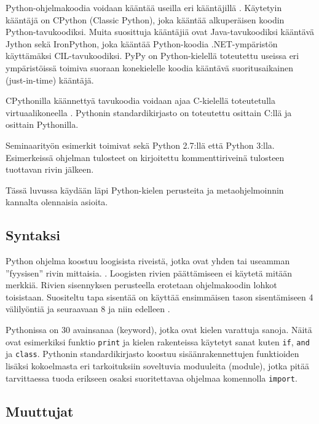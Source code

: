 \documentclass[finnish]{tktltiki2}
\theoremstyle{definition}
\theoremstyle{remark}
\begin{document}
Python-ohjelmakoodia voidaan kääntää useilla eri kääntäjillä \cite{martelli2006python}. Käytetyin kääntäjä on CPython (Classic Python), joka kääntää alkuperäisen koodin Python-tavukoodiksi. Muita suosittuja kääntäjiä ovat Java-tavukoodiksi kääntävä Jython sekä IronPython, joka kääntää Python-koodia .NET-ympäristön käyttämäksi CIL-tavukoodiksi. PyPy on Python-kielellä toteutettu useissa eri ympäristöissä toimiva suoraan konekielelle koodia kääntävä suoritusaikainen (just-in-time) kääntäjä. %

CPythonilla käännettyä tavukoodia voidaan ajaa C-kielellä toteutetulla virtuaalikoneella \cite{martelli2006python}. Pythonin standardikirjasto on toteutettu osittain C:llä ja osittain Pythonilla.

Seminaarityön esimerkit toimivat sekä Python 2.7:llä että Python 3:lla. Esimerkeissä ohjelman tulosteet on kirjoitettu kommenttiriveinä tulosteen tuottavan rivin jälkeen.

Tässä luvussa käydään läpi Python-kielen perusteita ja metaohjelmoinnin kannalta olennaisia asioita.

\subsection{Syntaksi}

Python ohjelma koostuu loogisista riveistä, jotka ovat yhden tai useamman ''fyysisen'' rivin mittaisia. \cite{martelli2006python}. Loogisten rivien päättämiseen ei käytetä mitään merkkiä. Rivien sisennyksen perusteella erotetaan ohjelmakoodin lohkot toisistaan. Suositeltu tapa sisentää on käyttää ensimmäisen tason sisentämiseen 4 välilyöntiä ja seuraavaan 8 ja niin edelleen \cite{pep8}. 


Pythonissa on 30 avainsanaa (keyword), jotka ovat kielen varattuja sanoja. Näitä ovat esimerkiksi funktio \verb|print| ja kielen rakenteissa käytetyt sanat kuten \verb|if|, \verb|and| ja \verb|class|. Pythonin standardikirjasto koostuu sisäänrakennettujen funktioiden lisäksi kokoelmasta eri tarkoituksiin soveltuvia moduuleita (module), jotka pitää tarvittaessa tuoda erikseen osaksi suoritettavaa ohjelmaa komennolla \verb|import|.

\subsection{Muuttujat}
\end{document}
